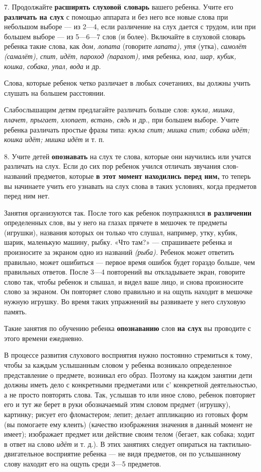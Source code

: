 \documentclass[a5paper]{book}
\renewcommand{\emph}[1]{\textit{#1}}
\begin{document}
7. Продолжайте \textbf{расширять слуховой словарь} вашего ребенка. Учите
его \textbf{различать на слух} с помощью аппарата и без него все новые
слова при небольшом выборе --- из 2---4, если различение на слух дается
с трудом, или при большем выборе --- из 5---6---7 слов (и более).
Включайте в слуховой словарь ребенка такие слова, как \emph{дом, лопата}
(говорите \emph{лапата), утя} (утка), \emph{самолёт (самалёт), спит,
идёт, пароход (парахот),} имя ребенка, \emph{юла, шар, кубик, кошка,
собака, упал, вода} и др.

Слова, которые ребенок четко различает в любых сочетаниях, вы должны
учить слушать на большем расстоянии.

Слабослышащим детям предлагайте различать больше слов: \emph{кукла,
мишка, плачет, прыгает, хлопает, встань, сядь} и др., при большем
выборе. Учите ребенка различать простые фразы типа: \emph{кукла спит;
мишка спит; собака идёт; кошка идёт; мишка идёт} и т. п.

8. Учите детей \textbf{опознавать} на слух те слова, которые они
научились или учатся различать на слух. Если до сих пор ребенок учился
отличать звучания слов-названий предметов, которые \textbf{в этот момент
находились перед ним,} то теперь вы начинаете учить его узнавать на слух
слова в таких условиях, когда предметов перед ним нет.

Занятия организуются так. После того как ребенок поупражнялся \textbf{в
различении} определенных слов, вы у него на глазах прячете в мешочек те
предметы (игрушки), названия которых он только что слушал, например,
утку, кубик, шарик, маленькую машину, рыбку. «Что там?» --- спрашиваете
ребенка и произносите за экраном одно из названий \emph{(рыба).} Ребенок
может ответить правильно, может ошибиться --- первое время ошибок будет
гораздо больше, чем правильных ответов. После 3---4 повторений вы
откладываете экран, говорите слово так, чтобы ребенок и слышал, и видел
ваше лицо, и снова произносите слово за экраном. Он повторяет слово
правильно и на ощупь находит в мешочке нужную игрушку. Во время таких
упражнений вы развиваете у него слуховую память.

Такие занятия по обучению ребенка \textbf{опознаванию} слов \textbf{на
слух} вы проводите с этого времени ежедневно.

В процессе развития слухового восприятия нужно постоянно стремиться к
тому, чтобы за каждым услышанным словом у ребенка возникало определенное
представление о предмете, возникал его образ. Поэтому на каждом занятии
дети должны иметь дело с конкретными предметами или с' конкретной
деятельностью, а не просто повторять слова. Так, услышав то или иное
слово, ребенок повторяет его и тут же берет в руки обозначаемый этим
словом предмет (игрушку), картинку; рисует его фломастером; лепит;
делает аппликацию из готовых форм (вы помогаете ему клеить) (качество
изображения значения в данный момент не имеет); изображает предмет или
действие своим телом (бегает, как собака; ходит в ответ на слово
\emph{идёт} и т. д.). В этих занятиях следует опираться на
тактильно-двигательное восприятие ребенка --- не видя предметов, он по
услышанному слову находит его на ощупь среди 3---5 предметов.
\end{document}
